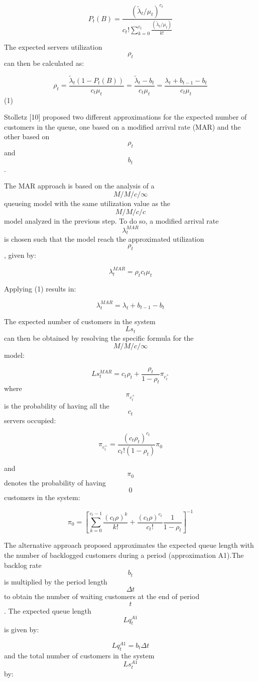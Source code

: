 $$ P_t(B) = \frac{(\widetilde{\lambda}_t / \mu_t)^{c_t}}{c_t!\sum_{k=0}^{c_t} \frac{(\widetilde{\lambda}_t / \mu_t)}{k!} } $$

The expected servers utilization $$ \rho_t $$ can then be calculated as:

$$ \rho_t = \frac{\widetilde{\lambda}_t(1 - P_t(B))}{c_t\mu_t} = \frac{\widetilde{\lambda}_t - b_t}{c_t\mu_t} = \frac{\lambda_t + b_{t-1} - b_t}{c_t\mu_t} $$ (1)

Stolletz [10] proposed two different approximations for the expected number of customers in the queue, one based on a modified arrival rate (MAR) and the other based on $$ \rho_t $$ and $$ b_t $$.

The MAR approach is based on the analysis of a $$ M/M/c/\infty $$ queueing model with the same utilization value as the $$ M/M/c/c $$ model analyzed in the previous step. To do so, a modified arrival rate $$ \lambda_t^{MAR} $$ is chosen such that the model reach the approximated utilization $$ \rho_t $$, given by:

$$ \lambda_t^{MAR} = \rho_t c_t \mu_t $$

Applying (1) results in:

$$ \lambda_t^{MAR} = \lambda_t + b_{t-1} - b_t $$

The expected number of customers in the system $$ Ls_t $$ can then be obtained by resolving the specific formula for the $$ M/M/c/\infty $$ model:

$$ Ls_t^{MAR} = c_t\rho_t + \frac{\rho_t}{1-\rho_t} \pi_{c_t^+} $$
where $$ \pi_{c_t^+} $$ is the probability of having all the $$ c_t $$ servers occupied:

$$ \pi_{c_t^+} = \frac{(c_t\rho_t)^{c_t}}{c_t!(1-\rho_t)}\pi_0$$

and $$ \pi_0 $$ denotes the probability of having $$ 0 $$ customers in the system:

$$ \pi_0 = \left[ \sum_{k=0}^{c_t-1} \frac{(c_t\rho)^k}{k!} + \frac{(c_t\rho)^{c_t}}{c_t!} \frac{1}{1-\rho_t} \right]^{-1} $$

The alternative approach proposed approximates the expected queue length with the number of backlogged customers during a period (approximation A1).The backlog rate $$ b_t $$ is multiplied by the period length $$ \Delta t $$ to obtain the number of waiting customers at the end of period $$ t $$. The expected queue length $$ Lq_t^{A1} $$ is given by:

$$ Lq_t^{A1} = b_t \Delta t $$
and the total number of customers in the system $$ Ls_t^{A1} $$ by:

